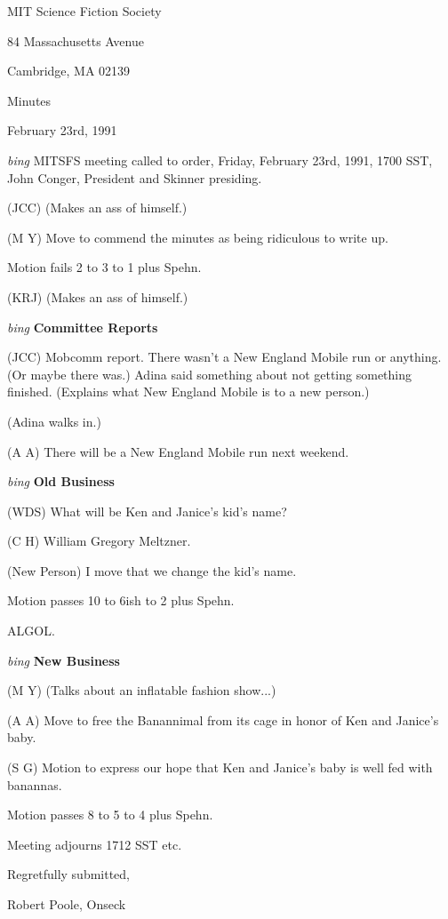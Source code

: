 \setlength{\topmargin}{-0.5in}
\setlength{\oddsidemargin}{0.0in}
\setlength{\evensidemargin}{0.0in}
\setlength{\textheight}{9in}
\setlength{\textwidth}{6.5in}



\begin{center}
MIT Science Fiction Society

84 Massachusetts Avenue

Cambridge, MA 02139

\vspace{0.2in}
Minutes

February 23rd, 1991

\end{center}

\vspace{0.15in}
{\em bing\/}  MITSFS meeting called to order, Friday, February 23rd, 1991,
1700 SST, John Conger, President and Skinner presiding.

(JCC) (Makes an ass of himself.)

(M Y) Move to commend the minutes as being ridiculous to write up.

Motion fails 2 to 3 to 1 plus Spehn.

(KRJ) (Makes an ass of himself.)

\vspace{0.15in}
{\em bing\/} {\bf Committee Reports\/}

(JCC) Mobcomm report.  There wasn't a New England Mobile run or anything.
(Or maybe there was.)
Adina said something about not getting something finished.  (Explains what
New England Mobile is to a new person.)

(Adina walks in.)

(A A) There will be a New England Mobile run next weekend.

\vspace{.15in}
{\em bing\/} {\bf Old Business\/}

(WDS) What will be Ken and Janice's kid's name?

(C H) William Gregory Meltzner.

(New Person) I move that we change the kid's name.

Motion passes 10 to 6ish to 2 plus Spehn.

ALGOL.

\vspace{0.15in}
{\em bing\/} {\bf New Business\/}

(M Y) (Talks about an inflatable fashion show...)

(A A) Move to free the Banannimal from its cage in honor of Ken and Janice's
baby.

(S G) Motion to express our hope that Ken and Janice's baby is well fed with
banannas.

Motion passes 8 to 5 to 4 plus Spehn.

Meeting adjourns 1712 SST etc.

\vspace{0.15in}
\begin{center}
Regretfully submitted,

Robert Poole, Onseck
\end{center}


